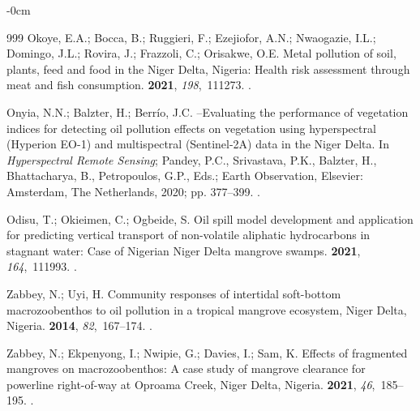 \documentclass[jmse,article,accept,pdftex,moreauthors]{Definitions/mdpi}
\begin{document}
\begin{adjustwidth}{-\extralength}{0cm}
\begin{thebibliography}{999}
Okoye, E.A.; Bocca, B.; Ruggieri, F.; Ezejiofor, A.N.; Nwaogazie, I.L.;
  Domingo, J.L.; Rovira, J.; Frazzoli, C.; Orisakwe, O.E.
\newblock Metal pollution of soil, plants, feed and food in the Niger Delta,
  Nigeria: Health risk assessment through meat and fish consumption.
 {\bf 2021}, {\em 198},~111273.
.

Onyia, N.N.; Balzter, H.; Berrío, J.C.
--Evaluating the performance of vegetation indices for detecting
  oil pollution effects on vegetation using hyperspectral (Hyperion EO-1) and
  multispectral (Sentinel-2A) data in the Niger Delta. In {\em Hyperspectral
  Remote Sensing}; Pandey, P.C., Srivastava, P.K., Balzter, H., Bhattacharya,
  B., Petropoulos, G.P., Eds.; Earth Observation, Elsevier: Amsterdam, The Netherlands,  2020; pp.
  377--399. %
.

Odisu, T.; Okieimen, C.; Ogbeide, S.
\newblock Oil spill model development and application for predicting vertical
  transport of non-volatile aliphatic hydrocarbons in stagnant water: Case of
  Nigerian Niger Delta mangrove swamps.
 {\bf 2021}, {\em 164},~111993.
.

Zabbey, N.; Uyi, H.
\newblock Community responses of intertidal soft-bottom macrozoobenthos to oil
  pollution in a tropical mangrove ecosystem, Niger Delta, Nigeria.
 {\bf 2014}, {\em 82},~167--174.
.

Zabbey, N.; Ekpenyong, I.; Nwipie, G.; Davies, I.; Sam, K.
\newblock Effects of fragmented mangroves on macrozoobenthos: A case study of
  mangrove clearance for powerline right-of-way at Oproama Creek, Niger Delta,
  Nigeria.
 {\bf 2021}, {\em 46},~185--195.
.


\end{thebibliography}
\end{adjustwidth}
\end{document}
